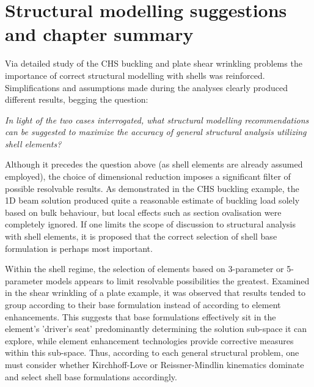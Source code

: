 \section{Structural modelling suggestions and chapter summary}
Via detailed study of the CHS buckling and plate shear wrinkling problems the importance of correct structural modelling with shells was reinforced. Simplifications and assumptions made during the analyses clearly produced different results, begging the question:

\begin{center}
\textit{In light of the two cases interrogated, what structural modelling recommendations can be suggested to maximize the accuracy of general structural analysis utilizing shell elements?}
\end{center}

Although it precedes the question above (as shell elements are already assumed employed), the choice of dimensional reduction imposes a significant filter of possible resolvable results. As demonstrated in the CHS buckling example, the 1D beam solution produced quite a reasonable estimate of buckling load solely based on bulk behaviour, but local effects such as section ovalisation were completely ignored. If one limits the scope of discussion to structural analysis with shell elements, it is proposed that the correct selection of shell base formulation is perhaps most important.

Within the shell regime, the selection of elements based on 3-parameter or 5-parameter models appears to limit resolvable possibilities the greatest. Examined in the shear wrinkling of a plate example, it was observed that results tended to group according to their base formulation instead of according to element enhancements. This suggests that base formulations effectively sit in the element's 'driver's seat' predominantly determining the solution sub-space it can explore, while element enhancement technologies provide corrective measures within this sub-space. Thus, according to each general structural problem, one must consider whether Kirchhoff-Love or Reissner-Mindlin kinematics dominate and select shell base formulations accordingly.

